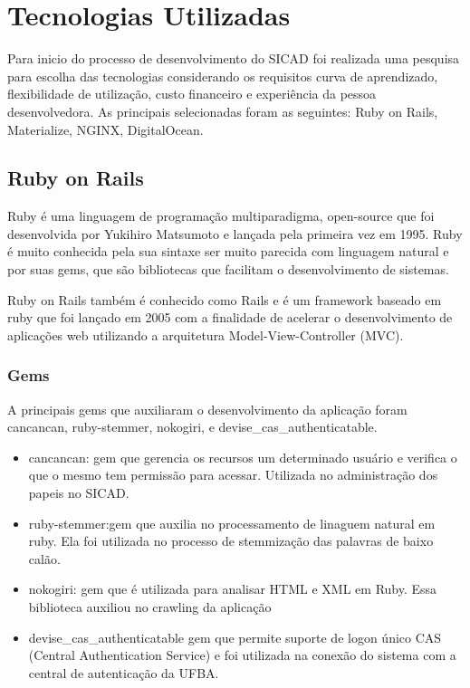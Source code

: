 \documentclass[12pt, a4paper]{report}
\begin{document}
\section{Tecnologias Utilizadas}
\label{section:tecutilizada}
Para inicio do processo de desenvolvimento do SICAD foi realizada uma pesquisa para escolha das tecnologias considerando os requisitos curva de aprendizado, flexibilidade de utilização, custo financeiro e experiência da pessoa desenvolvedora. As principais selecionadas foram as seguintes: Ruby on Rails, Materialize, NGINX, DigitalOcean.

\subsection{Ruby on Rails}
Ruby é uma linguagem de programação multiparadigma, open-source que foi desenvolvida por Yukihiro Matsumoto e lançada pela primeira vez em 1995. Ruby é muito conhecida pela sua sintaxe ser muito parecida com linguagem natural e por suas gems, que são bibliotecas que facilitam o desenvolvimento de sistemas.

Ruby on Rails também é conhecido como Rails e é um framework baseado em ruby que foi lançado em 2005 com a finalidade de acelerar o desenvolvimento de aplicações web utilizando a arquitetura Model-View-Controller (MVC). 

\subsubsection{Gems}
A principais gems que auxiliaram o desenvolvimento da aplicação foram cancancan, ruby-stemmer, nokogiri, e devise\_cas\_authenticatable.

\begin{itemize}
\item cancancan: gem que gerencia os recursos um determinado usuário e verifica o que o mesmo tem permissão para acessar. Utilizada no administração dos papeis no SICAD.
\item ruby-stemmer:gem que auxilia no processamento de linaguem natural em ruby. Ela foi utilizada no processo de stemmização das palavras de baixo calão.
\item nokogiri: gem que é utilizada para analisar HTML e XML em Ruby. Essa biblioteca auxiliou no crawling da aplicação
\item devise\_cas\_authenticatable gem que permite suporte de logon único CAS (Central Authentication Service) e foi utilizada na conexão do sistema com a central de autenticação da UFBA.
\end{itemize}
\end{document}
